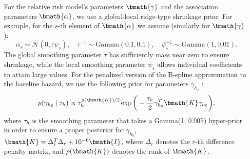 For the relative risk model's parameters $\bmath{\gamma}$ and the association parameters $\bmath{\alpha}$, we use a global-local ridge-type shrinkage prior. For example, for the $s$-{th} element of $\bmath{\alpha}$ we assume (similarly for $\bmath{\gamma}$):
\begin{equation*} 
\alpha_s \sim \mathcal{N}(0, \tau\psi_s), \quad \tau^{-1} \sim \mbox{Gamma}(0.1, 0.1),  \quad \psi_s^{-1} \sim \mbox{Gamma}(1, 0.01).
\end{equation*} 
The global smoothing parameter $\tau$ has sufficiently mass near zero to ensure shrinkage, while the local smoothing parameter $\psi_s$ allows individual coefficients to attain large values. For the penalized version of the B-spline approximation to the baseline hazard, we use the following prior for parameters $\gamma_{h_0}$ \citep{lang2004bayesian}:
\begin{equation*}
p(\gamma_{h_0} \mid \tau_h) \propto \tau_h^{\rho(\bmath{K})/2} \exp\bigg(-\frac{\tau_h}{2}\gamma_{h_0}^T \bmath{K} \gamma_{h_0}\bigg),
\end{equation*}
where $\tau_h$ is the smoothing parameter that takes a Gamma(1, 0.005) hyper-prior in order to ensure a proper posterior for $\gamma_{h_0}$, $\bmath{K} = \Delta_r^T \Delta_r + 10^{-6} \bmath{I}$, where $\Delta_r$ denotes the $r$-th difference penalty matrix, and $\rho(\bmath{K})$ denotes the rank of $\bmath{K}$.